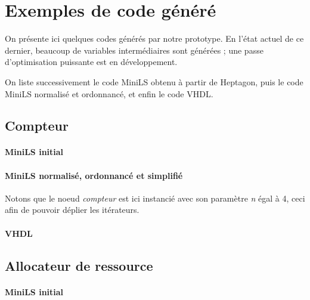\documentclass[9pt,a4paper]{article}
\newcommand{\LANG}{Heptagon}
\begin{document}
\section{Exemples de code généré}

On présente ici quelques codes générés par notre prototype. En l'état actuel de
ce dernier, beaucoup de variables intermédiaires sont générées ; une passe
d'optimisation puissante est en développement.

On liste successivement le code MiniLS obtenu à partir de \LANG{}, puis le code
MiniLS normalisé et ordonnancé, et enfin le code VHDL.

\subsection{Compteur}

\paragraph{MiniLS initial}

\small

\normalsize

\paragraph{MiniLS normalisé, ordonnancé et simplifié}

Notons que le noeud \textit{compteur} est ici instancié avec son paramètre
\textit{n} égal à 4, ceci afin de pouvoir déplier les itérateurs.

\small

\normalsize

\paragraph{VHDL}

\small

\normalsize

\subsection{Allocateur de ressource}

\paragraph{MiniLS initial}

\small

\normalsize
\end{document}
